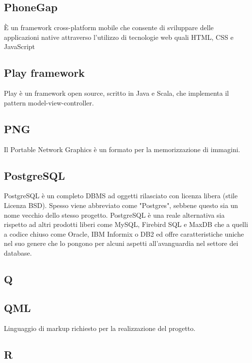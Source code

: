 \subsection{PhoneGap}
È un framework cross-platform mobile che consente di sviluppare delle applicazioni native attraverso l'utilizzo di tecnologie web quali HTML, CSS e JavaScript

\subsection{Play framework}
Play è un framework open source, scritto in Java e Scala, che implementa il pattern model-view-controller.

\subsection{PNG}
Il Portable Network Graphics è un formato per la memorizzazione di immagini.

\subsection{PostgreSQL}
PostgreSQL è un completo DBMS ad oggetti rilasciato con licenza libera (stile Licenza BSD). Spesso viene abbreviato come "Postgres", sebbene questo sia un nome vecchio dello stesso progetto. PostgreSQL è una reale alternativa sia rispetto ad altri prodotti liberi come MySQL, Firebird SQL e MaxDB che a quelli a codice chiuso come Oracle, IBM Informix o DB2 ed offre caratteristiche uniche nel suo genere che lo pongono per alcuni aspetti all'avanguardia nel settore dei database.

\newpage

\begin{center}
\Huge\section{\uppercase{Q}}
\end{center}

\subsection{QML}
Linguaggio di markup richiesto per la realizzazione del progetto.

\newpage

\begin{center}
\Huge\section{\uppercase{R}}
\end{center}

